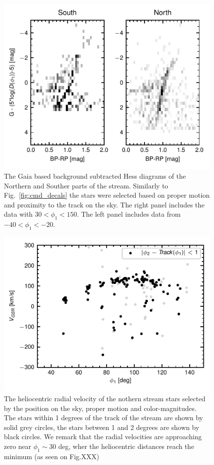 \documentclass[a4paper,useAMS,usenatbib]{mnras}
\begin{document}
%
\begin{figure}
\includegraphics{gaia_cmd.pdf}
\caption{The Gaia based background subtracted Hess diagrams of the
  Northern and Souther parts of the stream. Similarly to
  Fig.~\ref{fig:cmd_decals} the stars were selected based on proper
  motion and proximity to the track on the sky. The right panel
  includes the data with $30<\phi_1<150$. The left panel includes data
  from $-40<\phi_1<-20$.}
\label{fig:cmd_gaia}
\end{figure}
%

%
\begin{figure}
\includegraphics{orphan_spec.pdf}
\caption{The heliocentric radial velocity of the nothern stream stars
  selected by the position on the sky, proper motion and
  color-magnitudes.  The stars within 1 degrees of the track of the
  stream are shown by solid grey circles, the stars between 1 and 2
  degrees are shown by black circles. We remark that the radial
  velocities are approaching zero near $\phi_1 \sim 30 $ deg, wher the
  heliocentric distances reach the minimum (as seen on Fig.XXX)}
\label{fig:hrv}
\end{figure}
%
\end{document}
